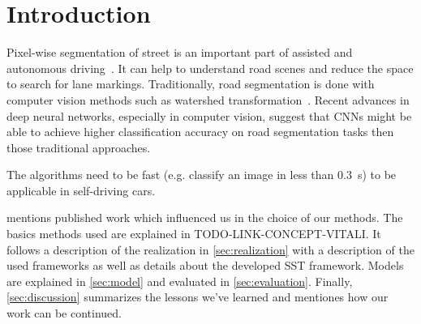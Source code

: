 
\section{Introduction}
Pixel-wise segmentation of street is an important part of assisted and
autonomous driving~\cite{Tarel2009}. It can help to understand road scenes and
reduce the space to search for lane markings. Traditionally, road segmentation
is done with computer vision methods such as watershed
transformation~\cite{Beucher1990}. Recent advances in deep neural networks,
especially in computer vision, suggest that \glspl{CNN} might be able to
achieve higher classification accuracy on road segmentation tasks then those
traditional approaches.

The algorithms need to be fast (e.g. classify an image in less than
\SI{0.3}{\second}) to be applicable in self-driving cars.

 mentions published work which influenced us in the
choice of our methods. The basics methods used are explained in
TODO-LINK-CONCEPT-VITALI. It follows a description of the realization in
\cref{sec:realization} with a description of the used frameworks as well as
details about the developed SST framework. Models are explained in
\cref{sec:model} and evaluated in \cref{sec:evaluation}. Finally,
\cref{sec:discussion} summarizes the lessons we've learned and mentiones how
our work can be continued.